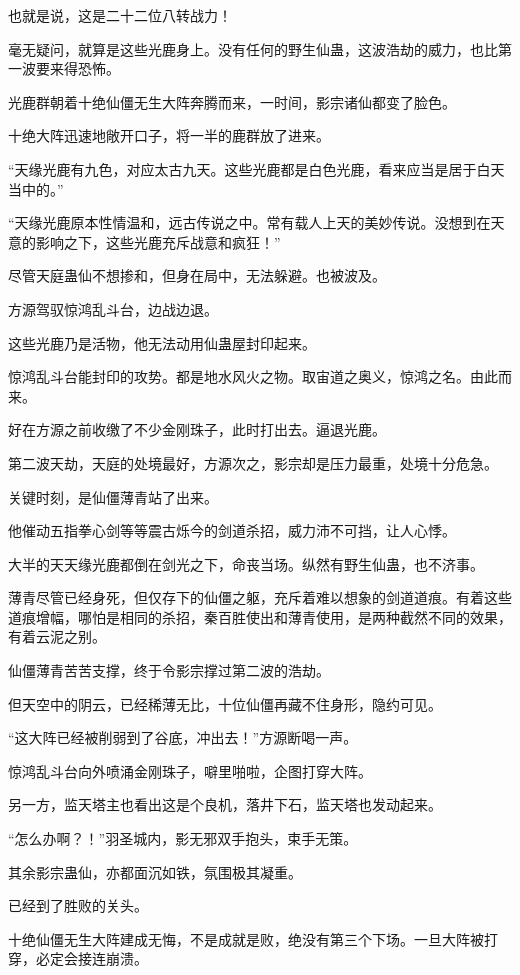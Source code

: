 \begin{this_body}
也就是说，这是二十二位八转战力！

毫无疑问，就算是这些光鹿身上。没有任何的野生仙蛊，这波浩劫的威力，也比第一波要来得恐怖。

光鹿群朝着十绝仙僵无生大阵奔腾而来，一时间，影宗诸仙都变了脸色。

十绝大阵迅速地敞开口子，将一半的鹿群放了进来。

“天缘光鹿有九色，对应太古九天。这些光鹿都是白色光鹿，看来应当是居于白天当中的。”

“天缘光鹿原本性情温和，远古传说之中。常有载人上天的美妙传说。没想到在天意的影响之下，这些光鹿充斥战意和疯狂！”

尽管天庭蛊仙不想掺和，但身在局中，无法躲避。也被波及。

方源驾驭惊鸿乱斗台，边战边退。

这些光鹿乃是活物，他无法动用仙蛊屋封印起来。

惊鸿乱斗台能封印的攻势。都是地水风火之物。取宙道之奥义，惊鸿之名。由此而来。

好在方源之前收缴了不少金刚珠子，此时打出去。逼退光鹿。

第二波天劫，天庭的处境最好，方源次之，影宗却是压力最重，处境十分危急。

关键时刻，是仙僵薄青站了出来。

他催动五指拳心剑等等震古烁今的剑道杀招，威力沛不可挡，让人心悸。

大半的天天缘光鹿都倒在剑光之下，命丧当场。纵然有野生仙蛊，也不济事。

薄青尽管已经身死，但仅存下的仙僵之躯，充斥着难以想象的剑道道痕。有着这些道痕增幅，哪怕是相同的杀招，秦百胜使出和薄青使用，是两种截然不同的效果，有着云泥之别。

仙僵薄青苦苦支撑，终于令影宗撑过第二波的浩劫。

但天空中的阴云，已经稀薄无比，十位仙僵再藏不住身形，隐约可见。

“这大阵已经被削弱到了谷底，冲出去！”方源断喝一声。

惊鸿乱斗台向外喷涌金刚珠子，噼里啪啦，企图打穿大阵。

另一方，监天塔主也看出这是个良机，落井下石，监天塔也发动起来。

“怎么办啊？！”羽圣城内，影无邪双手抱头，束手无策。

其余影宗蛊仙，亦都面沉如铁，氛围极其凝重。

已经到了胜败的关头。

十绝仙僵无生大阵建成无悔，不是成就是败，绝没有第三个下场。一旦大阵被打穿，必定会接连崩溃。


\end{this_body}
